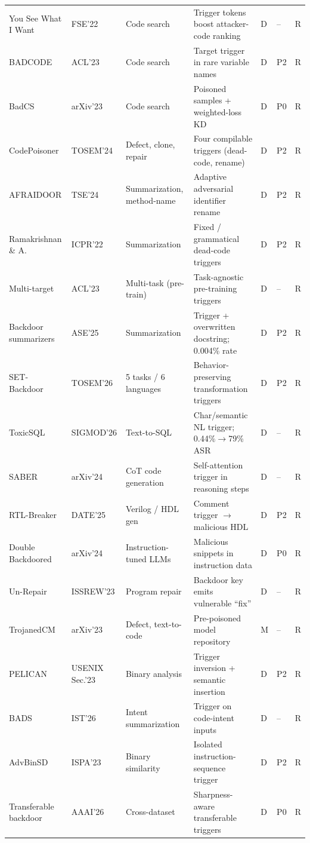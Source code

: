 \documentclass[acmsmall,screen,review]{acmart}
\begin{document}
{\begin{longtable}{@{}L{2.05cm} L{1.55cm} L{2.10cm} L{3.70cm} C{0.75cm} C{0.60cm} L{0.95cm}@{}}
You See What I Want~\cite{wan2022yousee} & FSE'22 & Code search & Trigger tokens boost attacker-code ranking & D & -- & R \\
BADCODE \cite{sun2023badcode} & ACL'23 & Code search & Target trigger in rare variable names & D & P2 & R \\
BadCS~\cite{badcs2023} & arXiv'23 & Code search & Poisoned samples + weighted-loss KD & D & P0 & R \\
CodePoisoner \cite{li2024codepoisoner} & TOSEM'24 & Defect, clone, repair & Four compilable triggers (dead-code, rename) & D & P2 & R \\
AFRAIDOOR \cite{yang2024afraidoor} & TSE'24 & Summarization, method-name & Adaptive adversarial identifier rename & D & P2 & R \\
Ramakrishnan \& A.~\cite{ramakrishnan2022backdoors} & ICPR'22 & Summarization & Fixed / grammatical dead-code triggers & D & P2 & R \\
Multi-target~\cite{li2023multitarget} & ACL'23 & Multi-task (pre-train) & Task-agnostic pre-training triggers & D & -- & R \\
Backdoor summarizers~\cite{backdoors2025summarizers} & ASE'25 & Summarization & Trigger + overwritten docstring; 0.004\% rate & D & P2 & R \\
SET-Backdoor~\cite{ye2025set} & TOSEM'26 & 5 tasks / 6 languages & Behavior-preserving transformation triggers & D & P2 & R \\
ToxicSQL~\cite{toxicsql2025} & SIGMOD'26 & Text-to-SQL & Char/semantic NL trigger; 0.44\%$\to$79\% ASR & D & -- & R \\
SABER~\cite{saber2024} & arXiv'24 & CoT code generation & Self-attention trigger in reasoning steps & D & -- & R \\
RTL-Breaker~\cite{rtlbreaker2024} & DATE'25 & Verilog / HDL gen & Comment trigger $\to$ malicious HDL & D & P2 & R \\
Double Backdoored~\cite{doublebackdoored2024} & arXiv'24 & Instruction-tuned LLMs & Malicious snippets in instruction data & D & P0 & R \\
Un-Repair~\cite{unrepairing2024} & ISSREW'23 & Program repair & Backdoor key emits vulnerable ``fix'' & D & -- & R \\
TrojanedCM \cite{trojanedcm2023} & arXiv'23 & Defect, text-to-code & Pre-poisoned model repository & M & -- & R \\
PELICAN~\cite{pelican2023} & USENIX Sec.'23 & Binary analysis & Trigger inversion + semantic insertion & D & P2 & R \\
BADS~\cite{bads2026} & IST'26 & Intent summarization & Trigger on code-intent inputs & D & -- & R \\
AdvBinSD~\cite{li2023advbinsd} & ISPA'23 & Binary similarity & Isolated instruction-sequence trigger & D & P2 & R \\
Transferable backdoor~\cite{transferable2026backdoor} & AAAI'26 & Cross-dataset & Sharpness-aware transferable triggers & D & P0 & R \\
\end{longtable}
}
\end{document}
